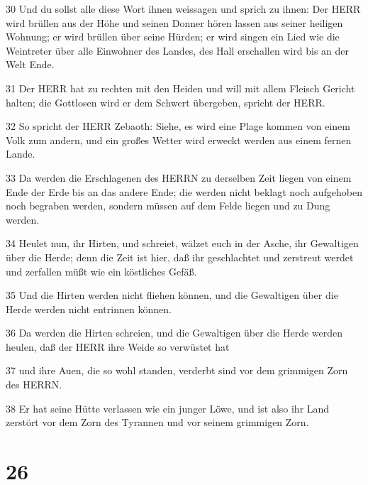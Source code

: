 \par 30 Und du sollst alle diese Wort ihnen weissagen und sprich zu ihnen: Der HERR wird brüllen aus der Höhe und seinen Donner hören lassen aus seiner heiligen Wohnung; er wird brüllen über seine Hürden; er wird singen ein Lied wie die Weintreter über alle Einwohner des Landes, des Hall erschallen wird bis an der Welt Ende.
\par 31 Der HERR hat zu rechten mit den Heiden und will mit allem Fleisch Gericht halten; die Gottlosen wird er dem Schwert übergeben, spricht der HERR.
\par 32 So spricht der HERR Zebaoth: Siehe, es wird eine Plage kommen von einem Volk zum andern, und ein großes Wetter wird erweckt werden aus einem fernen Lande.
\par 33 Da werden die Erschlagenen des HERRN zu derselben Zeit liegen von einem Ende der Erde bis an das andere Ende; die werden nicht beklagt noch aufgehoben noch begraben werden, sondern müssen auf dem Felde liegen und zu Dung werden.
\par 34 Heulet nun, ihr Hirten, und schreiet, wälzet euch in der Asche, ihr Gewaltigen über die Herde; denn die Zeit ist hier, daß ihr geschlachtet und zerstreut werdet und zerfallen müßt wie ein köstliches Gefäß.
\par 35 Und die Hirten werden nicht fliehen können, und die Gewaltigen über die Herde werden nicht entrinnen können.
\par 36 Da werden die Hirten schreien, und die Gewaltigen über die Herde werden heulen, daß der HERR ihre Weide so verwüstet hat
\par 37 und ihre Auen, die so wohl standen, verderbt sind vor dem grimmigen Zorn des HERRN.
\par 38 Er hat seine Hütte verlassen wie ein junger Löwe, und ist also ihr Land zerstört vor dem Zorn des Tyrannen und vor seinem grimmigen Zorn.

\chapter{26}

